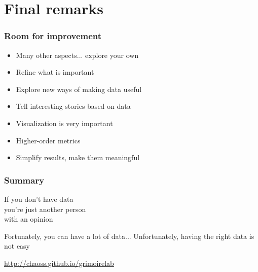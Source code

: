 \documentclass[17pt,aspectratio=169,hyperref=pdfusetitle]{beamer}
\begin{document}
\section{Final remarks}


\begin{frame}
\frametitle{Room for improvement}

  \begin{itemize}
    \item Many other aspects... explore your own
    \item Refine what is important
    \item Explore new ways of making data useful
    \item Tell interesting stories based on data
    \item Visualization is very important
    \item Higher-order metrics
    \item Simplify results, make them meaningful
\end{itemize}

\end{frame}


\begin{frame}
\frametitle{Summary}

\begin{center}
  If you don't have data \\
  you're just another person \\
  with an opinion \\
\end{center}

\vspace{.2cm}
  Fortunately, you can have a lot of data...
  \vspace{.2cm}
  Unfortunately, having the right data is not easy
  \vspace{.2cm}
\begin{flushright}
  \url{http://chaoss.github.io/grimoirelab} \\
\end{flushright}

\end{frame}
\end{document}
